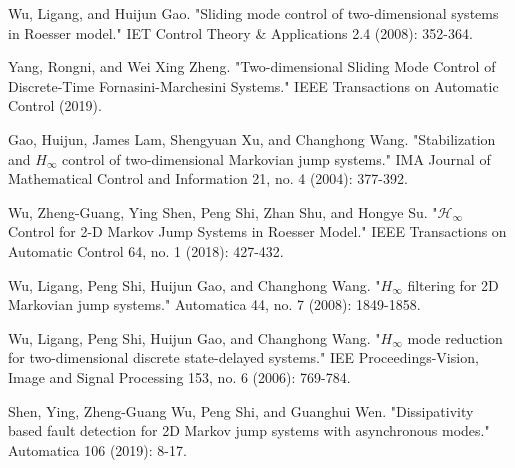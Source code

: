 \documentclass[conference]{IEEEtran}
\begin{document}
\begin{thebibliography}{1}
	Wu, Ligang, and Huijun Gao. "Sliding mode control of two-dimensional systems in Roesser model." IET Control Theory \& Applications 2.4 (2008): 352-364.
	
	Yang, Rongni, and Wei Xing Zheng. "Two-dimensional Sliding Mode Control of Discrete-Time Fornasini-Marchesini Systems." IEEE Transactions on Automatic Control (2019).
	
	Gao, Huijun, James Lam, Shengyuan Xu, and Changhong Wang. "Stabilization and $H_{\infty}$ control of two-dimensional Markovian jump systems." IMA Journal of Mathematical Control and Information 21, no. 4 (2004): 377-392.
	
	Wu, Zheng-Guang, Ying Shen, Peng Shi, Zhan Shu, and Hongye Su. "$\mathcal H_ {\infty} $ Control for 2-D Markov Jump Systems in Roesser Model." IEEE Transactions on Automatic Control 64, no. 1 (2018): 427-432.
	
	Wu, Ligang, Peng Shi, Huijun Gao, and Changhong Wang. "$H_{\infty}$ filtering for 2D Markovian jump systems." Automatica 44, no. 7 (2008): 1849-1858.
	
	Wu, Ligang, Peng Shi, Huijun Gao, and Changhong Wang. "$H_{\infty}$ mode reduction for two-dimensional discrete state-delayed systems." IEE Proceedings-Vision, Image and Signal Processing 153, no. 6 (2006): 769-784.
	
	
	Shen, Ying, Zheng-Guang Wu, Peng Shi, and Guanghui Wen. "Dissipativity based fault detection for 2D Markov jump systems with asynchronous modes." Automatica 106 (2019): 8-17.
	
	
	
	
	
	
	
	
\end{thebibliography}




\end{document}
